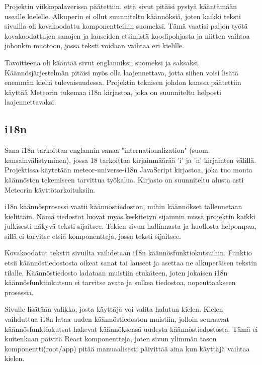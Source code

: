 \documentclass[11pt,a4paper,titlepage,oneside]{article}
\begin{document}
Projektin viikkopalaverissa päätettiin, että sivut pitäisi pystyä kääntämään usealle kielelle.
Alkuperin ei ollut suunniteltu käännöksiä, joten kaikki teksti sivuilla oli kovakoodattu komponentteihin suomeksi. 
Tämä vaatisi paljon työtä kovakoodattujen sanojen ja lauseiden etsimistä koodipohjasta ja niitten vaihtoa johonkin muotoon, jossa teksti voidaan vaihtaa eri kielille.
\medskip

Tavoitteena oli kääntää sivut englanniksi, suomeksi ja saksaksi. Käännösjärjestelmän pitäisi myös olla laajennettava, jotta siihen voisi lisätä enemmän kieliä tulevaisuudessa.
Projektin teknisen johdon kanssa päätettiin käyttää Meteorin tukemaa i18n kirjastoa, joka on suunniteltu helposti laajennettavaksi.
\medskip







\subsection*{i18n}


Sana i18n tarkoittaa englannin sanaa "internationalization" (suom. kansainvälistyminen), jossa 18 tarkoittaa kirjainmäärää 'i' ja 'n' kirjainten välillä. Projektissa käytetään meteor-universe-i18n JavaScript kirjastoa, joka tuo monta käännösten tekemiseen tarvittua työkalua.
Kirjasto on suunniteltu alusta asti Meteorin käyttötarkoituksiin.\medskip

i18n käännösprosessi vaatii käännöstiedoston, mihin käännökset tallennetaan kielittäin.
Nämä tiedostot luovat myös keskitetyn sijainnin missä projektin kaikki julkisesti näkyvä teksti sijaitsee. Tekien sivun hallinnasta ja huollosta helpompaa, sillä ei tarvitse etsiä komponentteja, jossa teksti sijaitsee. 
\medskip

Kovakoodatut tekstit sivuilta vaihdetaan i18n käännösfunktiokutsuihin. Funktio etsii käännöstiedostosta oikeat sanat tai lauseet ja asettaa ne alkuperäisen tekstin tilalle. 
Käännöstiedosto ladataan muistiin etukäteen, joten jokaisen i18n käännösfunktiokutsun ei tarvitse avata ja sulkea tiedostoa, nopeuttaakseen prosessia.\medskip

Sivulle lisätään valikko, josta käyttäjä voi valita halutun kielen. Kielen vaihduttua i18n lataa uuden käännöstiedoston muistiin, jolloin seuraavat käännösfunktiokutsut hakevat käännöksensä uudesta käännöstiedostosta.
Tämä ei kuitenkaan päivitä React komponentteja, joten sivun ylimmän tason komponentti(root/app) pitää manuaalisesti päivittää aina kun käyttäjä vaihtaa kielen.\medskip
\end{document}
